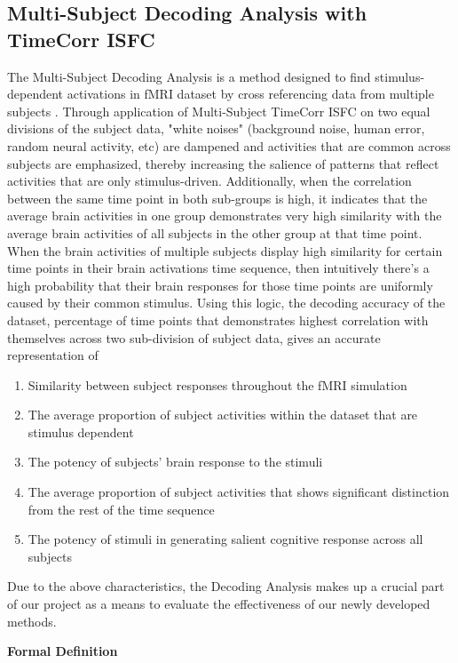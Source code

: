 \documentclass[11pt]{article}
\begin{document}
\subsection{Multi-Subject Decoding Analysis with TimeCorr ISFC}
The Multi-Subject Decoding Analysis is a method designed to find stimulus-dependent activations in fMRI dataset by cross referencing data from multiple subjects \cite{jeremy2017}. Through application of Multi-Subject TimeCorr ISFC on two equal divisions of the subject data, "white noises" (background noise, human error, random neural activity, etc) are dampened and activities that are common across subjects are emphasized, thereby increasing the salience of patterns that reflect activities that are only stimulus-driven. Additionally, when the correlation between the same time point in both sub-groups is high, it indicates that the average brain activities in one group demonstrates very high similarity with the average brain activities of all subjects in the other group at that time point. When the brain activities of multiple subjects display high similarity for certain time points in their brain activations time sequence, then intuitively there's a high probability that their brain responses for those time points are uniformly caused by their common stimulus. Using this logic, the decoding accuracy of the dataset, percentage of time points that demonstrates highest correlation with themselves across two sub-division of subject data, gives an accurate representation of

\begin{enumerate}
\item Similarity between subject responses throughout the fMRI simulation
\item The average proportion of subject activities within the dataset that are stimulus dependent
\item The potency of subjects' brain response to the stimuli
\item The average proportion of subject activities that shows significant distinction from the rest of the time sequence
\item The potency of stimuli in generating salient cognitive response across all subjects
\end{enumerate}

Due to the above characteristics, the Decoding Analysis makes up a crucial part of our project as a means to evaluate the effectiveness of our newly developed methods.

\large{\textbf{Formal Definition}}
\end{document}
